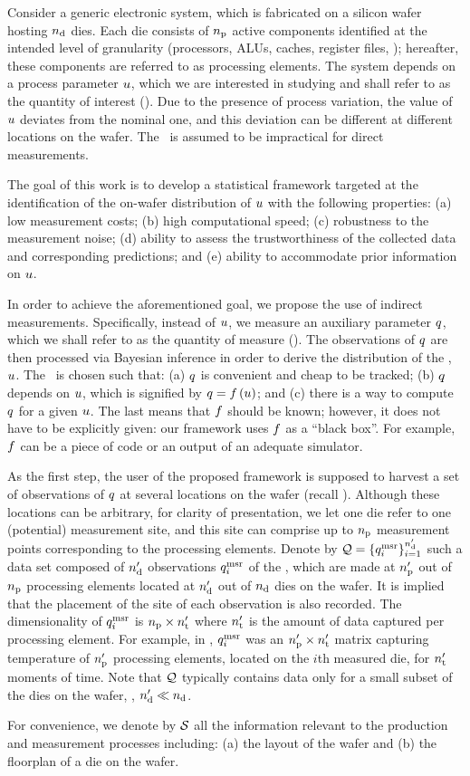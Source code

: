 Consider a generic electronic system, which is fabricated on a silicon wafer hosting ${n_\text{d}}$ dies.
Each die consists of ${n_\text{p}}$ active components identified at the intended level of granularity (processors, ALUs, caches, register files, \etc); hereafter, these components are referred to as processing elements.
The system depends on a process parameter $u$, which we are interested in studying and shall refer to as the quantity of interest (\qoi).
Due to the presence of process variation, the value of $u$ deviates from the nominal one, and this deviation can be different at different locations on the wafer.
The \qoi\ is assumed to be impractical for direct measurements.

The goal of this work is to develop a statistical framework targeted at the identification of the on-wafer distribution of $u$ with the following properties: (a) low measurement costs; (b) high computational speed; (c) robustness to the measurement noise; (d) ability to assess the trustworthiness of the collected data and corresponding predictions; and (e) ability to accommodate prior information on $u$.

In order to achieve the aforementioned goal, we propose the use of indirect measurements.
Specifically, instead of $u$, we measure an auxiliary parameter $q$, which we shall refer to as the quantity of measure (\qom).
The observations of $q$ are then processed via Bayesian inference in order to derive the distribution of the \qoi, $u$.
The \qom\ is chosen such that: (a) $q$ is convenient and cheap to be tracked; (b) $q$ depends on $u$, which is signified by $\q = \oBB{\u}$; and (c) there is a way to compute $q$ for a given $u$.
The last means that $\oBB$ should be known; however, it does not have to be explicitly given: our framework uses $\oBB$ as a ``black box''.
For example, $\oBB$ can be a piece of code or an output of an adequate simulator.

As the first step, the user of the proposed framework is supposed to harvest a set of observations of $q$ at several locations on the wafer (recall ).
Although these locations can be arbitrary, for clarity of presentation, we let one die refer to one (potential) measurement site, and this site can comprise up to ${n_\text{p}}$ measurement points corresponding to the processing elements.
Denote by $\mathcal{Q} = \{ q_i^{\text{msr}} \}_{i = 1}^{n_\text{d}'}$ such a data set composed of ${n_\text{d}'}$ observations $q_i^{\text{msr}}$ of the \qom, which are made at ${n_\text{p}'}$ out of ${n_\text{p}}$ processing elements located at ${n_\text{d}'}$ out of ${n_\text{d}}$ dies on the wafer.
It is implied that the placement of the site of each observation is also recorded.
The dimensionality of $q_i^{\text{msr}}$ is ${n_\text{p}} \times {n_\text{t}'}$ where ${n_\text{t}'}$ is the amount of data captured per processing element.
For example, in , $q_i^{\text{msr}}$ was an ${n_\text{p}'} \times {n_\text{t}'}$ matrix capturing temperature of ${n_\text{p}'}$ processing elements, located on the $i$th measured die, for ${n_\text{t}'}$ moments of time.
Note that $\mathcal{Q}$ typically contains data only for a small subset of the dies on the wafer, \ie, ${n_\text{d}'} \ll {n_\text{d}}$.

For convenience, we denote by $\mathcal{S}$ all the information relevant to the production and measurement processes including: (a) the layout of the wafer and (b) the floorplan of a die on the wafer.
